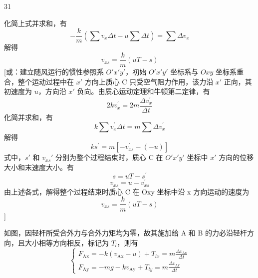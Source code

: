 \begin{solution}{31}
\begin{subsolution}
\begin{subproblem}
      化简上式并求和，有
      \begin{equation}
        - \frac{k}{m} (\sum v_{x} \Delta t - u \sum \Delta t) = \sum \Delta v_{x}
      \end{equation}
      解得
      \begin{equation}
        v_{x s} = \frac{k}{m} (u T - s)
        \label{eq:19.p31}
      \end{equation}
      [或：建立随风运行的惯性参照系 $O'x'y'$，初始 $O'x'y'$ 坐标系与 $Oxy$ 坐标系重合，整个运动过程中在 $x'$ 方向上质心 C 只受空气阻力作用，该力沿 $x'$ 正向，其初速度为 $u$，方向沿 $x'$ 负向。由质心运动定理和牛顿第二定律，有
      \begin{equation}
        2 k v_{x}^{\prime} = 2 m \frac{\Delta v_{x}^{\prime}}{\Delta t}
        \label{eq:20.p31}
      \end{equation}
      化简并求和，有
      \begin{equation}
        k \sum v_{x}^{\prime} \Delta t = m \sum \Delta v_{x}^{\prime}
      \end{equation}
      解得
      \begin{equation}
        k s^{\prime} = m [ - v_{x s}^{\prime} - (- u) ]
      \end{equation}
      式中，$s'$ 和 $v_{xs}'$ 分别为整个过程结束时，质心 C 在 $O'x'y'$ 坐标中 $x'$ 方向的位移大小和末速度大小。有
      \begin{equation}
        s = u T - s^{\prime}
      \end{equation}
      \begin{equation}
        v_{x s} = u - v_{x s}^{\prime}
      \end{equation}
      由上述各式，解得整个过程结束时质心 C 在 Oxy 坐标中沿 x 方向运动的速度为
      \begin{equation}
        v_{x s} = \frac{k}{m} (u T - s)
      \end{equation}
      ]
    \end{subproblem}
    \begin{subproblem}[转动过程]
      如图，因轻杆所受合外力与合外力矩均为零，故其施加给 A 和 B 的力必沿轻杆方向，且大小相等方向相反，标记为 $T_{l}$，则有
      \begin{equation}
        \left\{
          \begin{array}{l}
            F_{\mathrm{Ax}} = - k (v_{\mathrm{Ax}} - u) + T_{l x} = m \frac{\Delta v_{\mathrm{Ax}}}{\Delta t} \\
            F_{\mathrm{Ay}} = - m g - k v_{\mathrm{Ay}} + T_{l y} = m \frac{\Delta v_{\mathrm{Ay}}}{\Delta t}

\end{array}
\end{equation}
\end{subproblem}
\end{subsolution}
\end{solution}
